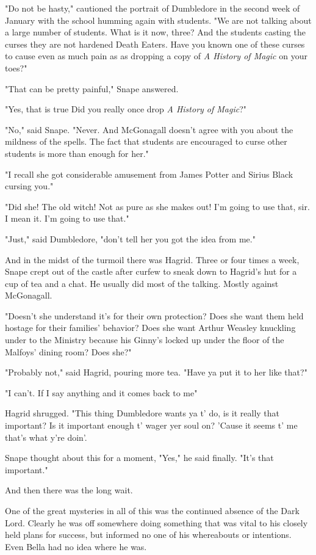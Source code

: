 "Do not be hasty," cautioned the portrait of Dumbledore in the second week of January with the school humming again with students. "We are not talking about a large number of students. What is it now, three? And the students casting the curses{\el} they are not hardened Death Eaters. Have you known one of these curses to cause even as much pain as{\el} as dropping a copy of \emph{A History of Magic} on your toes?"

"That can be pretty painful," Snape answered.

"Yes, that is true{\el} Did you really once drop \emph{A History of Magic}{\el}?"

"No," said Snape. "Never. And McGonagall doesn't agree with you about the mildness of the spells. The fact that students are encouraged to curse other students is more than enough for her."

"I recall she got considerable amusement from James Potter and Sirius Black cursing you."

"Did she! The old witch! Not as pure as she makes out! I'm going to use that, sir. I mean it. I'm going to use that."

"Just," said Dumbledore, "don't tell her you got the idea from me."

And in the midst of the turmoil there was Hagrid. Three or four times a week, Snape crept out of the castle after curfew to sneak down to Hagrid's hut for a cup of tea and a chat. He usually did most of the talking. Mostly against McGonagall.

"Doesn't she understand it's for their own protection? Does she want them held hostage for their families' behavior? Does she want Arthur Weasley knuckling under to the Ministry because his Ginny's locked up under the floor of the Malfoys' dining room? Does she?"

"Probably not," said Hagrid, pouring more tea. "Have ya put it to her like that?"

"I can't. If I say anything and it comes back to me{\el}"

Hagrid shrugged. "This thing Dumbledore wants ya t' do, is it really that important? Is it important enough t' wager yer soul on? 'Cause it seems t' me that's what y're doin'.

Snape thought about this for a moment, "Yes," he said finally. "It's that important."

And then there was the long wait.

One of the great mysteries in all of this was the continued absence of the Dark Lord. Clearly he was off somewhere doing something that was vital to his closely held plans for success, but informed no one of his whereabouts or intentions. Even Bella had no idea where he was.

